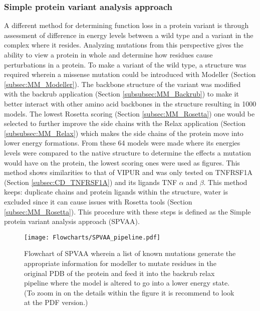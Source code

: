 	\subsubsection{Simple protein variant analysis approach}
	A different method for determining function loss in a protein variant is through assessment of difference in energy levels between a wild type and a variant in the complex where it resides. Analyzing mutations from this perspective gives the ability to view a protein in whole and determine how residues cause perturbations in a protein. To make a variant of the wild type, a structure was required wherein a missense mutation could be introduced with Modeller (Section \ref{subsec:MM_Modeller}). The backbone structure of the variant was modified with the backrub application (Section \ref{subsubsec:MM_Backrub}) to make it better interact with other amino acid backbones in the structure resulting in 1000 models. The lowest Rosetta scoring (Section \ref{subsec:MM_Rosetta}) one would be selected to further improve the side chains with the Relax application	(Section \ref{subsubsec:MM_Relax}) which makes the side chains of the protein move into lower energy formations. From these 64 models were made where its energies levels were compared to the native structure to determine the effects a mutation would have on the protein, the lowest scoring ones were used as figures. This method shows similarities to that of VIPUR and was only tested on TNFRSF1A (Section \ref{subsec:CD_TNFRSF1A}) and its ligands TNF $\alpha$ and $\beta$. This method keeps: duplicate chains and protein ligands within the structure, water is excluded since it can cause issues with Rosetta tools (Section \ref{subsec:MM_Rosetta}). This procedure with these steps is defined as the Simple protein variant analysis approach (SPVAA).
	
	\begin{figure}[!ht]
		\centering
		\texttt{[image: Flowcharts/SPVAA\_pipeline.pdf]}
		\caption[Flowchart SPVAA pipeline]{Flowchart of SPVAA wherein a list of known mutations generate the appropriate information for modeller to mutate residues in the original PDB of the protein and feed it into the backrub relax pipeline where the model is altered to go into a lower energy state.(To zoom in on the details within the figure it is recommend to look at the PDF version.)}
	\end{figure}
	\newpage
	
